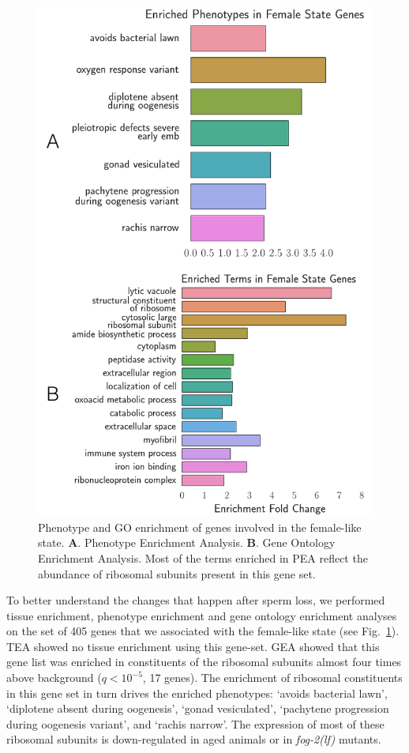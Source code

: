 \documentclass[9pt,twocolumn,twoside]{gsag3jnl}
\newcommand{\fog}{\emph{\mbox{fog-2(lf)}}}
\newcommand{\femalen}{405}
\begin{document}
\begin{figure}
  \renewcommand{\familydefault}{\sfdefault}\normalfont{}
  \centering
  \includegraphics[width=0.9\linewidth]
  {../../output/figs/final_figs/female_state_enrichment.pdf}
  \caption{
    Phenotype and GO enrichment of genes involved in the female-like state.
    \textbf{A}. Phenotype Enrichment Analysis.
    \textbf{B}. Gene Ontology Enrichment Analysis.
    Most of the terms enriched in PEA reflect the abundance of ribosomal subunits
    present in this gene set.
  }
\label{fig:female_state_enrich}
\end{figure}

To better understand the changes that happen after sperm loss, we performed
tissue enrichment, phenotype enrichment and gene ontology enrichment analyses on
the set of \femalen{} genes that we associated with the female-like state (see
Fig.~\ref{fig:female_state_enrich}). TEA showed no tissue enrichment using this
gene-set. GEA showed that this gene list was enriched in constituents of the
ribosomal subunits almost four times above background ($q<10^{-5}$, 17 genes).
The enrichment of ribosomal constituents in this gene set in turn drives the
enriched phenotypes: `avoids bacterial lawn', `diplotene absent during
oogenesis', `gonad vesiculated', `pachytene progression during oogenesis
variant', and `rachis narrow'. The expression of most of these ribosomal
subunits is down-regulated in aged animals or in \fog{} mutants.
\end{document}
